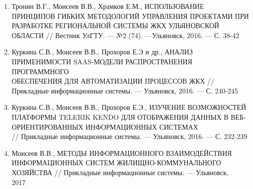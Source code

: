 
\begin{enumerate}
	\item Тронин В.Г., Моисеев В.В., Храмков Е.М., ИСПОЛЬЗОВАНИЕ ПРИНЦИПОВ ГИБКИХ МЕТОДОЛОГИЙ УПРАВЛЕНИЯ ПРОЕКТАМИ ПРИ РАЗРАБОТКЕ РЕГИОНАЛЬНОЙ СИСТЕМЫ ЖКХ УЛЬЯНОВСКОЙ ОБЛАСТИ // Вестник УлГТУ. — №2 (74). —Ульяновск, 2016. — С. 38-42
	\item Куркина С.В., Моисеев В.В., Прохоров Е.Э и др., АНАЛИЗ ПРИМЕНИМОСТИ SAAS-МОДЕЛИ РАСПРОСТРАНЕНИЯ ПРОГРАММНОГО \\ ОБЕСПЕЧЕНИЯ ДЛЯ АВТОМАТИЗАЦИИ ПРОЦЕССОВ ЖКХ // Прикладные информационные системы. — Ульяновск, 2016. — С. 240-245
	\item Куркина С.В., Моисеев В.В., Прохоров Е.Э., ИЗУЧЕНИЕ ВОЗМОЖНОСТЕЙ ПЛАТФОРМЫ TELERIK KENDO ДЛЯ ОТОБРАЖЕНИЯ ДАННЫХ В ВЕБ-ОРИЕНТИРОВАННЫХ ИНФОРМАЦИОННЫХ СИСТЕМАХ \\ // Прикладные информационные системы. — Ульяновск, 2016. — С. 232-239
	\item Моисеев В.В., МЕТОДЫ ИНФОРМАЦИОННОГО ВЗАИМОДЕЙСТВИЯ ИНФОРМАЦИОННЫХ СИСТЕМ ЖИЛИЩНО-КОММУНАЛЬНОГО \\ ХОЗЯЙСТВА // Прикладные информационные системы. — Ульяновск, \\ 2017
\end{enumerate}
